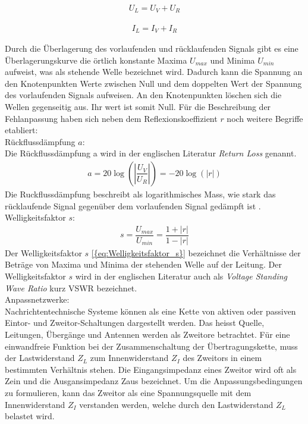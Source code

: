 \begin{eqnarray}\label{eq:AnpassungULast}
U_L = U_V + U_R
\end{eqnarray}

\begin{eqnarray}\label{eq:AnpassungILast}
I_L = I_V + I_R
\end{eqnarray}

Durch die Überlagerung des vorlaufenden und rücklaufenden Signals gibt es eine Überlagerungskurve die örtlich konstante Maxima $U_{max}$ und Minima $U_{min}$ aufweist, was als stehende Welle bezeichnet wird. Dadurch kann die Spannung an den Knotenpunkten Werte zwischen Null und dem doppelten Wert der Spannung des vorlaufenden Signals aufweisen. An den Knotenpunkten löschen sich die Wellen gegenseitig aus. Ihr wert ist somit Null. Für die Beschreibung der Fehlanpassung haben sich neben dem Reflexionskoeffizient  $r$ noch weitere Begriffe etabliert: \\

Rückflussdämpfung $a$:\\
Die Rückflussdämpfung a wird in der englischen Literatur \textit{Return Loss} genannt.
\begin{eqnarray}\label{eq:Ruckflussdämpfung_a}
a=20\log\left(\left| \dfrac{U_V}{U_R}\right| \right)=-20\log(|r|)
\end{eqnarray}
Die Ruckflussdämpfung beschreibt als logarithmisches Mass, wie stark das rücklaufende Signal gegenüber dem vorlaufenden Signal gedämpft ist \cite{Tekom}.\\

Welligkeitsfaktor $s$:
\begin{eqnarray}\label{eq:Welligkeitsfaktor_s}
s=\dfrac{U_{max}}{U_{min}}=\dfrac{1+|r|}{1-|r|}
\end{eqnarray}
Der Welligkeitsfaktor $s$ \ref{{eq:Welligkeitsfaktor_s}} bezeichnet die Verhältnisse der Beträge von Maxima und Minima der stehenden Welle auf der Leitung. Der Welligkeitsfaktor $s$ wird in der englischen Literatur auch als \textit{Voltage Standing Wave Ratio} kurz VSWR bezeichnet. \\

Anpassnetzwerke: \\
Nachrichtentechnische Systeme können als eine Kette von aktiven oder passiven Eintor- und Zweitor-Schaltungen dargestellt werden. Das heisst Quelle, Leitungen, Übergänge und Antennen werden als Zweitore betrachtet. Für eine einwandfreie Funktion bei der Zusammenschaltung der Übertragungskette, muss der Lastwiderstand $Z_L$ zum Innenwiderstand $Z_I$ des Zweitors in einem bestimmten Verhältnis stehen. Die Eingangsimpedanz eines Zweitor wird oft als Zein und die Ausgansimpedanz Zaus bezeichnet. 
Um die Anpassungsbedingungen zu formulieren, kann das Zweitor als eine Spannungsquelle mit dem Innenwiderstand $Z_I$ verstanden werden, welche durch den Lastwiderstand $Z_L$ belastet wird.

